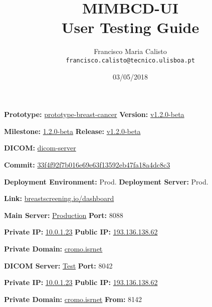 \documentclass{article}
\title{
MIMBCD-UI
\\
User Testing Guide
}
\author{
  Francisco Maria Calisto\\
  \texttt{francisco.calisto@tecnico.ulisboa.pt}
}
\date{03/05/2018}
\begin{document}
\maketitle

\textbf{Prototype:} \hyperlink{https://github.com/MIMBCD-UI/prototype-breast-cancer}{prototype-breast-cancer} \hfill \textbf{Version:} \hyperlink{https://github.com/MIMBCD-UI/prototype-breast-screening/tree/b02f15495b6cdd0700696ec918d6f329278670d0}{v1.2.0-beta}

\textbf{Milestone:} \hyperlink{https://github.com/MIMBCD-UI/prototype-breast-screening/milestone/1}{1.2.0-beta} \hfill \textbf{Release:} \hyperlink{https://github.com/MIMBCD-UI/prototype-breast-screening/releases/tag/v1.2.0-beta}{v1.2.0-beta}

\hfill

\textbf{DICOM:} \hyperlink{https://github.com/MIMBCD-UI/dicom-server}{dicom-server}

\textbf{Commit:} \hyperlink{https://github.com/MIMBCD-UI/dicom-server/tree/33f4f92f7b016e69e63f13592eb47fa18a4dc8c3}{33f4f92f7b016e69e63f13592eb47fa18a4dc8c3}

\hfill

\textbf{Deployment Environment:} Prod. \hfill \textbf{Deployment Server:} Prod.

\textbf{Link:} \hyperlink{http://www.breastscreening.io/dashboard/}{breastscreening.io/dashboard}

\hfill

\textbf{Main Server:} \hyperlink{http://breastscreening.isr.tecnico.ulisboa.pt:8088/src/public/index.html}{Production} \hfill \textbf{Port:} 8088

\textbf{Private IP:} \hyperlink{http://10.0.1.23:8088/src/public/index.html}{10.0.1.23} \hfill \textbf{Public IP:} \hyperlink{http://193.136.138.62:8088/src/public/index.html}{193.136.138.62}

\textbf{Private Domain:} \hyperlink{http://cromo.isrnet:8088/src/public/index.html}{cromo.isrnet}

\hfill

\textbf{DICOM Server:} \hyperlink{http://breastscreening.isr.tecnico.ulisboa.pt:8042/app/explorer.html}{Test} \hfill \textbf{Port:} 8042

\textbf{Private IP:} \hyperlink{http://10.0.1.23:8042/app/explorer.html}{10.0.1.23} \hfill \textbf{Public IP:} \hyperlink{http://193.136.138.62:8042/app/explorer.html}{193.136.138.62}

\textbf{Private Domain:} \hyperlink{http://cromo.isrnet:8042/app/explorer.html}{cromo.isrnet} \hfill \textbf{From:} 8142

\clearpage











\clearpage



\end{document}
